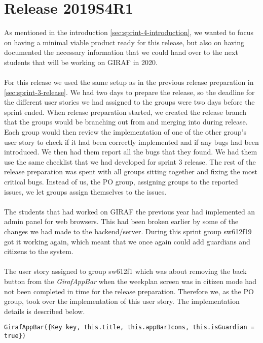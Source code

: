 \section{Release 2019S4R1}
As mentioned in the introduction \autoref{sec:sprint-4-introduction}, we wanted to focus on having a minimal viable product ready for this release, but also on having documented the necessary information that we could hand over to the next students that will be working on GIRAF in 2020.
\\\\
For this release we used the same setup as in the previous release preparation in \autoref{sec:sprint-3-release}. 
We had two days to prepare the release, so the deadline for the different user stories we had assigned to the groups were two days before the sprint ended. When release preparation started, we created the release branch that the groups would be branching out from and merging into during release. Each group would then review the implementation of one of the other group's user story to check if it had been correctly implemented and if any bugs had been introduced. We then had them report all the bugs that they found. We had them use the same checklist that we had developed for sprint 3 release. The rest of the release preparation was spent with all groups sitting together and fixing the most critical bugs. Instead of us, the PO group, assigning groups to the reported issues, we let groups assign themselves to the issues.
\\\\
The students that had worked on GIRAF the previous year had implemented an admin panel for web browsers. This had been broken earlier by some of the changes we had made to the backend/server. During this sprint group sw612f19 got it working again, which meant that we once again could add guardians and citizens to the system.
\\\\
The user story assigned to group sw612f1 which was about removing the back button from the \textit{GirafAppBar} when the weekplan screen was in citizen mode had not been completed in time for the release preparation. Therefore we, as the PO group, took over the implementation of this user story. The implementation details is described below.
\begin{lstlisting}[caption={Removing back button from the citizens screen},label={lst:removeBackButton},language={[Sharp]C}]
    GirafAppBar({Key key, this.title, this.appBarIcons, this.isGuardian = true})
\end{lstlisting}
